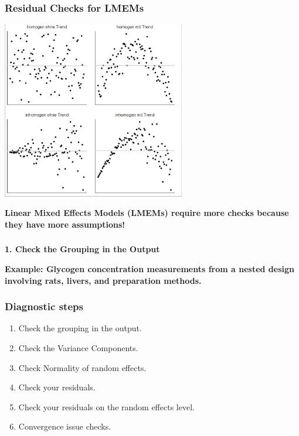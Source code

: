 \documentclass{beamer}
\begin{document}
\begin{frame}
    \frametitle{Residual Checks for LMEMs}
    \begin{center}
    \includegraphics[width=0.6\textwidth]{lectures/day_7_diagnostics_of_mems/figures/residuals.png}    
    \end{center}
    \textbf{Linear Mixed Effects Models (LMEMs) require more checks because they have more assumptions!}
\end{frame}

\begin{frame}
    \frametitle{}
    \huge\color{purple}\textbf{1. Check the Grouping in the Output}
    \vspace{0.5cm}
    
    \normalsize\color{black}\textbf{Example: Glycogen concentration measurements from a nested design involving rats, livers, and preparation methods.}
\end{frame}


\begin{frame}
    \frametitle{Diagnostic steps}
    
    \begin{enumerate}
        \item Check the grouping in the output.
        \item Check the Variance Components.
        \item Check Normality of random effects.
        \item Check your residuals.
        \item Check your residuals on the random effects level.
        \item Convergence issue checks.
    \end{enumerate}
\end{frame}
\end{document}

